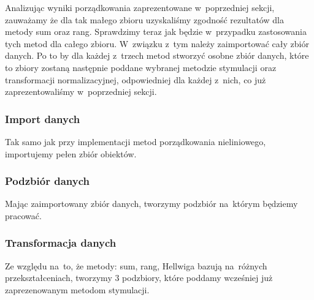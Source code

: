 \documentclass[12pt,a4paper]{report}
\begin{document}
{Analizując wyniki porządkowania zaprezentowane w~poprzedniej sekcji, zauważamy że dla tak małego zbioru uzyskaliśmy zgodność rezultatów dla metody sum oraz rang. Sprawdzimy teraz jak będzie w~przypadku zastosowania tych metod dla całego zbioru. W~związku z~tym należy zaimportować cały zbiór danych. Po to by dla każdej z~trzech metod stworzyć osobne zbiór danych, które to zbiory zostaną następnie poddane wybranej metodzie stymulacji oraz transformacji normalizacyjnej, odpowiedniej dla każdej z~nich, co już zaprezentowaliśmy w~poprzedniej sekcji.  

\subsubsection{Import danych}
Tak samo jak przy implementacji metod porządkowania nieliniowego, importujemy pełen zbiór obiektów.

\begin{Shaded}
\begin{Highlighting}[]
\StringTok{ }\NormalTok{(}\NormalTok{, }
                            \NormalTok{)}
\end{Highlighting}
\end{Shaded}

\subsubsection{Podzbiór danych}
Mając zaimportowany zbiór danych, tworzymy podzbiór na~którym będziemy pracować. 
\begin{Shaded}
\begin{Highlighting}[]
\NormalTok{dane_porzadkowanie<-zbior_danych[}\NormalTok{(}\NormalTok{,}\NormalTok{,}\NormalTok{,}
                                   \NormalTok{,}
                                   \NormalTok{,}\NormalTok{)]}
\end{Highlighting}
\end{Shaded}

\subsubsection{Transformacja danych}
Ze względu na~to, że metody: sum, rang, Hellwiga bazują na~różnych przekształceniach, tworzymy 3 podzbiory, które poddamy wcześniej już zaprezenowanym metodom stymulacji. 

}
\end{document}
